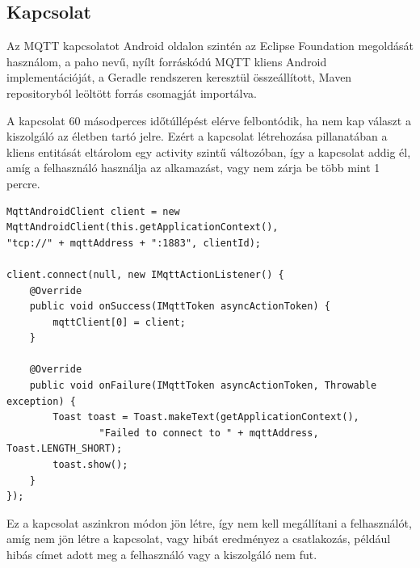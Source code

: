 \documentclass[
]{thesis-ekf}
\theoremstyle{definition}
\theoremstyle{remark}
\begin{document}
\subsection{Kapcsolat}
Az MQTT kapcsolatot Android oldalon szintén az Eclipse Foundation megoldását használom, a paho\cite{paho} nevű,
nyílt forráskódú MQTT kliens Android implementációját, a Geradle rendszeren keresztül összeállított,
Maven repositoryból leöltött forrás csomagját importálva.

A kapcsolat 60 másodperces időtúllépést elérve felbontódik, ha nem kap választ a kiszolgáló az életben tartó
jelre. Ezért a kapcsolat létrehozása pillanatában a kliens entitását eltárolom egy activity szintű változóban,
így a kapcsolat addig él, amíg a felhasználó használja az alkamazást, vagy nem zárja be több mint 1 percre.

\lstset{language=Java}  
\begin{lstlisting}[frame=single]
MqttAndroidClient client = new MqttAndroidClient(this.getApplicationContext(),
"tcp://" + mqttAddress + ":1883", clientId);

client.connect(null, new IMqttActionListener() {
	@Override
	public void onSuccess(IMqttToken asyncActionToken) {
		mqttClient[0] = client;
	}

	@Override
	public void onFailure(IMqttToken asyncActionToken, Throwable exception) {
		Toast toast = Toast.makeText(getApplicationContext(),
				"Failed to connect to " + mqttAddress, Toast.LENGTH_SHORT);
		toast.show();
	}
});
\end{lstlisting}

Ez a kapcsolat aszinkron módon jön létre, így nem kell megállítani a felhasználót, amíg nem jön létre a
kapcsolat, vagy hibát eredményez a csatlakozás, például hibás címet adott meg a felhasználó vagy
a kiszolgáló nem fut.
\end{document}
